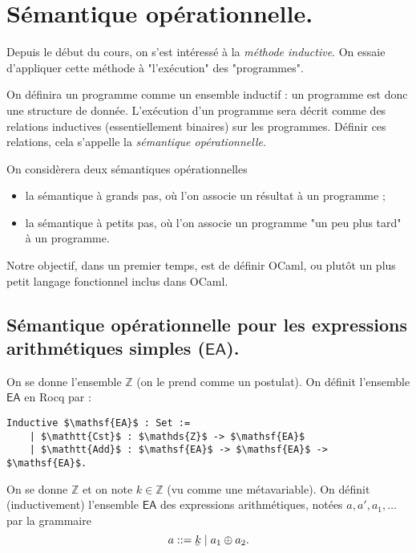 \documentclass[../main]{subfiles}
\begin{document}
  \chapter{Sémantique opérationnelle.}

  \minitoc

  Depuis le début du cours, on s'est intéressé à la \textit{méthode inductive}.
  On essaie d'appliquer cette méthode à "l'exécution" des "programmes".

  On définira un programme comme un ensemble inductif : un programme est donc une structure de donnée.
  L'exécution d'un programme sera décrit comme des relations inductives (essentiellement binaires) sur les programmes.
  Définir ces relations, cela s'appelle la \textit{sémantique opérationnelle}.

  On considèrera deux sémantiques opérationnelles
  \begin{itemize}
    \item la sémantique à grands pas, où l'on associe un résultat à un programme ;
    \item la sémantique à petits pas, où l'on associe un programme "un peu plus tard" à un programme.
  \end{itemize}

  Notre objectif, dans un premier temps, est de définir OCaml, ou plutôt un plus petit langage fonctionnel inclus dans OCaml.

  \section{Sémantique opérationnelle pour les expressions arithmétiques simples ($\mathsf{EA}$).}

  On se donne l'ensemble $\mathds{Z}$ (on le prend comme un postulat).
  On définit l'ensemble $\mathsf{EA}$ en Rocq par :
  \begin{lstlisting}[language=coq,caption=Définition des expressions arithmétiques simples]
    Inductive $\mathsf{EA}$ : Set :=
    | $\mathtt{Cst}$ : $\mathds{Z}$ -> $\mathsf{EA}$
    | $\mathtt{Add}$ : $\mathsf{EA}$ -> $\mathsf{EA}$ -> $\mathsf{EA}$.
  \end{lstlisting}

  \begin{note}
    On se donne $\mathds{Z}$ et on note $k \in \mathds{Z}$ (vu comme une métavariable).
    On définit (inductivement) l'ensemble $\mathsf{EA}$ des expressions arithmétiques, notées $a, a', a_1, \ldots$ par la grammaire
    \[
      a ::= \ubar{k}  \mid a_1 \oplus a_2
    .\] 
  \end{note}
\end{document}
